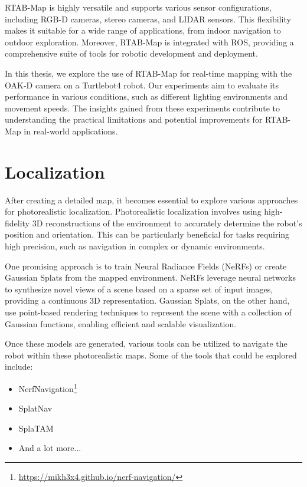 RTAB-Map is highly versatile and supports various sensor configurations, including RGB-D cameras, stereo cameras, and LIDAR sensors. This flexibility makes it suitable for a wide range of applications, from indoor navigation to outdoor exploration. Moreover, RTAB-Map is integrated with ROS, providing a comprehensive suite of tools for robotic development and deployment.

In this thesis, we explore the use of RTAB-Map for real-time mapping with the OAK-D camera on a Turtlebot4 robot. Our experiments aim to evaluate its performance in various conditions, such as different lighting environments and movement speeds. The insights gained from these experiments contribute to understanding the practical limitations and potential improvements for RTAB-Map in real-world applications.

\section{Localization}

After creating a detailed map, it becomes essential to explore various approaches for photorealistic localization. Photorealistic localization involves using high-fidelity 3D reconstructions of the environment to accurately determine the robot's position and orientation. This can be particularly beneficial for tasks requiring high precision, such as navigation in complex or dynamic environments.

One promising approach is to train Neural Radiance Fields (NeRFs) or create Gaussian Splats from the mapped environment. NeRFs leverage neural networks to synthesize novel views of a scene based on a sparse set of input images, providing a continuous 3D representation. Gaussian Splats, on the other hand, use point-based rendering techniques to represent the scene with a collection of Gaussian functions, enabling efficient and scalable visualization.

Once these models are generated, various tools can be utilized to navigate the robot within these photorealistic maps. Some of the tools that could be explored include:
\begin{itemize}
\setlength\itemsep{0em}
    \item NerfNavigation\footnote{\url{https://mikh3x4.github.io/nerf-navigation/}}
    \item SplatNav\cite{splatnav}
    \item SplaTAM\cite{splatam}
    \item And a lot more...\cite{nerf_robotics_cites}
\end{itemize}

